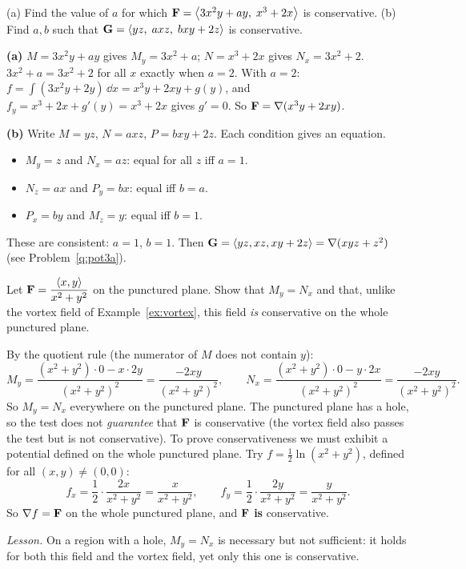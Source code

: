 \begin{problem}\label{q:const}
(a) Find the value of $a$ for which $\mathbf{F}=\left\langle 3x^2y+ay,\;x^3+2x \right\rangle$ is conservative.
(b) Find $a,b$ such that $\mathbf{G}=\left\langle yz,\;axz,\;bxy+2z \right\rangle$ is conservative.
\end{problem}
\begin{solution}
\textbf{(a)}
 $M=3x^2y+ay$ gives $M_y=3x^2+a$; $N=x^3+2x$ gives $N_x=3x^2+2$.
 $3x^2+a=3x^2+2$ for all $x$ exactly when $a=2$.
 With $a=2$: $f=\int(3x^2y+2y)\,\dd x=x^3y+2xy+g(y)$, and
$f_y=x^3+2x+g'(y)=x^3+2x$ gives $g'=0$. So $\mathbf{F}=\nabla(x^3y+2xy)$.

\textbf{(b)} Write $M=yz$, $N=axz$, $P=bxy+2z$. Each condition gives an equation.
\begin{itemize}
\item $M_y=z$ and $N_x=az$: equal for all $z$ iff $a=1$.
\item $N_z=ax$ and $P_y=bx$: equal iff $b=a$.
\item $P_x=by$ and $M_z=y$: equal iff $b=1$.
\end{itemize}
These are consistent: $a=1$, $b=1$. Then $\mathbf G=\left\langle yz,xz,xy+2z \right\rangle=\nabla(xyz+z^2)$
(see Problem~\ref{q:pot3a}).
\end{solution}

\begin{problem}[$*$]\label{q:radial2d}
Let $\mathbf{F}=\dfrac{\left\langle x,y \right\rangle}{x^2+y^2}$ on the punctured plane. Show that $M_y=N_x$ and
that, unlike the vortex field of Example~\ref{ex:vortex}, this field \emph{is}
conservative on the whole punctured plane.
\end{problem}
\begin{solution}
 By the quotient rule (the numerator of $M$ does not contain $y$):
\[
  M_y=\frac{(x^2+y^2)\cdot0-x\cdot2y}{(x^2+y^2)^2}=\frac{-2xy}{(x^2+y^2)^2},\qquad
  N_x=\frac{(x^2+y^2)\cdot0-y\cdot2x}{(x^2+y^2)^2}=\frac{-2xy}{(x^2+y^2)^2}.
\]
So $M_y=N_x$ everywhere on the punctured plane.
 The punctured plane has a hole, so the
test does not \emph{guarantee} that $\mathbf{F}$ is conservative (the vortex field also
passes the test but is not conservative). To prove conservativeness we must
exhibit a potential defined on the whole punctured plane.
 Try $f=\frac12\ln(x^2+y^2)$, defined for all $(x,y)\neq(0,0)$:
\[
  f_x=\frac12\cdot\frac{2x}{x^2+y^2}=\frac{x}{x^2+y^2},\qquad f_y=\frac12\cdot\frac{2y}{x^2+y^2}=\frac{y}{x^2+y^2}.
\]
So $\nabla f=\mathbf{F}$ on the whole punctured plane, and $\mathbf{F}$ \textbf{is} conservative.

\emph{Lesson.} On a region with a hole, $M_y=N_x$ is necessary but not sufficient: it holds
for both this field and the vortex field, yet only this one is conservative.
\end{solution}

